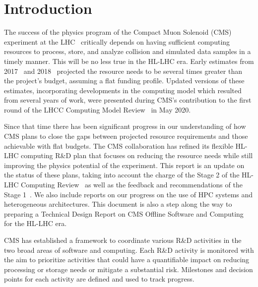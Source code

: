 \documentclass{cmspaper}
\begin{document}
\section{Introduction}

The success of the physics program of the Compact Muon Solenoid (CMS)~\cite{CMS_Paper_2008} experiment at the LHC~\cite{Evans_2008} critically depends on having  sufficient computing resources to process, store, and analyze collision and simulated data samples in a timely manner. This will be no less true in the HL-LHC era. Early estimates from 2017~\cite{Sexton_Kennedy_2018} and 2018~\cite{OCPublicResults} projected the resource needs to be several times greater than the project’s budget, assuming a flat funding profile. Updated versions of these estimates, incorporating developments in the computing model which resulted from several years of work, were presented during CMS’s contribution to the first round of the LHCC Computing Model Review~\cite{Software:2751565} in May 2020.

Since that time there has been significant progress in our understanding of how CMS plans to close the gaps between projected resource requirements and those achievable with flat budgets. The CMS collaboration has refined its flexible HL-LHC computing R\&D plan that focuses on reducing the resource needs while still improving the physics potential of the experiment. This report is an update on the status of these plans, taking into account the charge of the Stage 2 of the HL-LHC Computing Review~\cite{CERN-LHCC-2021-014} as well as the feedback and recommendations of the Stage 1~\cite{Boehnlein:2725487}. We also include reports on our progress on the use of HPC systems and heterogeneous architectures. This document is also a step along the way to preparing a Technical Design Report on CMS Offline Software and Computing for the HL-LHC era.
 
CMS has established a framework to coordinate various R\&D activities in the two broad areas of software and computing. Each R\&D activity is monitored with the aim to prioritize activities that could have a quantifiable impact on reducing processing or storage needs or mitigate a substantial risk. Milestones and decision points for each activity are defined and used to track progress.
 
\end{document}
